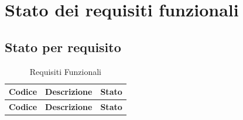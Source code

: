 \documentclass[a4paper,12pt]{article}
\begin{document}
{{    }

    \section{Stato dei requisiti funzionali} {
        \subsection{Stato per requisito} {
            \begin{longtable}{|>{\centering\arraybackslash}m{}|>{\centering\arraybackslash}m{}|>{\centering\arraybackslash}m{}|}
                \caption{Requisiti Funzionali} \\
                
                \hline
                \rowcolor{lightgray}
                \textbf{Codice} & \textbf{Descrizione} & \textbf{Stato} \\
                \hline
                \endfirsthead
                
                \hline
                \rowcolor{lightgray}
                \textbf{Codice} & \textbf{Descrizione} & \textbf{Stato} \\
                \hline
                \endhead
                

\end{longtable}}}}
\end{document}
